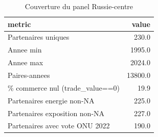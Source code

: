 \begin{table}

\caption{Couverture du panel Russie-centre}
\centering
\begin{tabular}[t]{lr}
\toprule
metric & value\\
\midrule
Partenaires uniques & 230.0\\
Annee min & 1995.0\\
Annee max & 2024.0\\
Paires-annees & 13800.0\\
\% commerce nul (trade\_value==0) & 19.9\\
Partenaires energie non-NA & 225.0\\
Partenaires exposition non-NA & 227.0\\
Partenaires avec vote ONU 2022 & 190.0\\
\bottomrule
\end{tabular}
\end{table}
